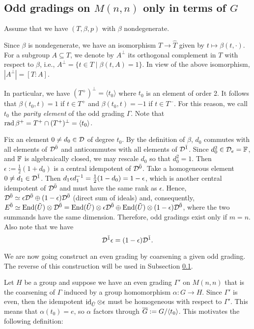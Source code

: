\subsection{Odd gradings on \texorpdfstring{$M(n,n)$}{M(n,n)} only in terms of \texorpdfstring{$G$}{G}}\label{ssec:second-odd}

Assume that we have $(T, \beta, p)$ with $\beta$ nondegenerate. 

Since $\beta$ is nondegenerate, we have an isomorphism $T\rightarrow \widehat T$ given by $t\mapsto \beta(t,\cdot)$. For a subgroup $A\subseteq T$, we denote by $A^\perp$ its orthogonal complement in $T$ with respect to $\beta$, i.e., $A^\perp = \{t\in T\mid \beta(t, A) =1\}$. In view of the above isomorphism, $|A^\perp| = [T:A]$.

In particular, we have $(T^+)^\perp = \langle t_0 \rangle$ where $t_0$ is an element of order 2. It follows that $\beta(t_0, t) = 1$ if $t\in T^+$ and $\beta(t_0, t) = -1$ if $t\in T^-$. For this reason, we call $t_0$ the \emph{parity element} of the odd grading $\Gamma$. Note that $\operatorname{rad} \beta^+ = T^+\cap (T^+)^\perp = \langle t_0 \rangle$.

Fix an element $0\neq d_0\in \mathcal{D}$  of degree $t_0$. By the definition of $\beta$, $d_0$ commutes with all elements of $\mathcal{D}^{\bar0}$ and anticommutes with all elements of $\mathcal{D}^{\bar1}$. Since $d_0^2\in \mathcal{D}_e = \mathbb{F}$, and $\mathbb{F}$ is algebraically closed, we may rescale $d_0$ so that $d_0^2=1$. Then $\epsilon := \frac{1}{2}(1+d_0)$ is a central idempotent of $\mathcal{D}^{\bar0}$. Take a homogeneous element $0\neq d_1\in\mathcal{D}^{\bar1}$. Then $d_1\epsilon d_1^{-1} = \frac{1}{2}(1-d_0)=1-\epsilon$, which is another central idempotent of $\mathcal{D}^{\bar0}$ and must have the same rank as $\epsilon$. 
Hence, $\mathcal{D}^{\bar0}\simeq \epsilon\mathcal{D}^{\bar0}\oplus (1-\epsilon)\mathcal{D}^{\bar0}$ (direct sum of ideals) and, consequently, $E^{\bar0} \simeq \operatorname{End}(\tilde U)\otimes \mathcal{D}^{\bar0} = \operatorname{End}(\tilde U)\otimes \epsilon\mathcal{D}^{\bar0} \oplus \operatorname{End}(\tilde U)\otimes (1-\epsilon)\mathcal{D}^{\bar0}$, where the two summands have the same dimension. Therefore, odd gradings exist only if $m=n$. 
Also note that we have 
\begin{equation}\label{eq:D1eps}
\mathcal{D}^{\bar1} \epsilon = (1-\epsilon) \mathcal{D}^{\bar1}.
\end{equation}

We are now going construct an even grading by coarsening a given odd grading. The reverse of this construction will be used in Subsection \ref{ssec:second-odd}.

Let $H$ be a group and suppose we have an even grading $\Gamma'$ on $M(n,n)$ that is the coarsening of $\Gamma$ induced by a group homomorphism $\alpha: G\rightarrow H$. Since $\Gamma'$ is even, then the idempotent $\operatorname{id}_{\tilde U}\otimes\epsilon$ must be homogeneous with respect to $\Gamma'$. This means that $\alpha(t_0)=e$, so $\alpha$ factors through $\barr G := G/\langle t_0 \rangle$. This motivates the following definition:

